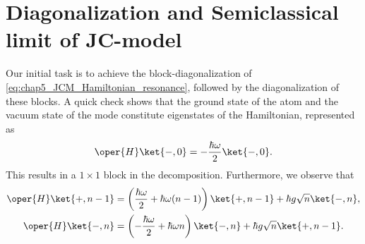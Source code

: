 \chapter{Diagonalization and Semiclassical limit of JC-model\label{appen:chap5_JC_calculations}}

Our initial task is to achieve the block-diagonalization of
\ref{eq:chap5_JCM_Hamiltonian_resonance}, followed by the diagonalization 
of these blocks. A quick check shows that the ground state of 
the atom and the vacuum state of the mode constitute eigenstates of 
the Hamiltonian, represented as
\begin{equation}
    \label{eq:appen_JCM_ground_state}
    \oper{H}\ket{-, 0} = -\frac{\hbar \omega}{2} \ket{-, 0}.
\end{equation}
This results in a $1 \times 1$ block in the decomposition. 
Furthermore, we observe that
\begin{equation}
    \label{eq:appen_JCM_excited_state}
    \begin{gathered}
        \oper{H}\ket{+, n-1} = \left( \frac{\hbar \omega}{2} + \hbar \omega (n-1) \right) 
        \ket{+, n-1} + \hbar g \sqrt{n} \ket{-, n},\\
    \oper{H}\ket{-, n} = \left( -\frac{\hbar \omega}{2} + \hbar \omega n \right) \ket{-, n} + \hbar g \sqrt{n} \ket{+, n-1}.
    \end{gathered}
\end{equation}

